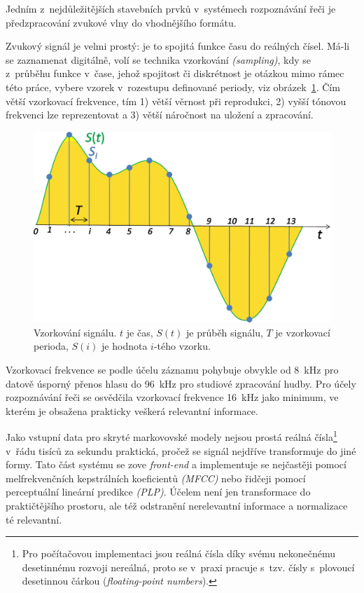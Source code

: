 Jedním z~nejdůležitějších stavebních prvků v~systémech rozpoznávání řeči je
předzpracování zvukové vlny do vhodnějšího formátu.

Zvukový signál je velmi prostý: je to spojitá funkce času do reálných čísel.
Má-li se zaznamenat digitálně, volí se technika vzorkování \textit{(sampling)},
kdy se z~průběhu funkce v~čase, jehož spojitost či diskrétnost je otázkou mimo
rámec této práce, vybere vzorek v~rozestupu definované periody, viz
obrázek~\ref{fig:sampling}. Čím větší
vzorkovací frekvence, tím 1) větší věrnost při reprodukci, 2) vyšší tónovou
frekvenci lze reprezentovat a 3) větší náročnost na uložení a zpracování.

\begin{figure}[htpb]
\includegraphics[scale=0.38]{rc/Signal_Sampling.png}
\caption{
    Vzorkování signálu. $t$ je čas, $S(t)$ je průběh signálu, $T$ je vzorkovací
    perioda, $S(i)$ je hodnota $i$-tého vzorku.
}
\label{fig:sampling}
\end{figure}

Vzorkovací frekvence se podle účelu záznamu pohybuje obvykle od 8~kHz pro
datově úsporný přenos hlasu do 96~kHz pro studiové zpracování hudby. Pro účely
rozpoznávání řeči se osvědčila vzorkovací frekvence 16~kHz jako minimum, ve
kterém je obsažena prakticky veškerá relevantní informace.

Jako vstupní data pro skryté markovovské modely nejsou prostá reálná
čísla\footnote{Pro počítačovou implementaci jsou reálná čísla díky svému
nekonečnému desetinnému rozvoji nereálná, proto se v~praxi pracuje s~tzv. čísly
s~plovoucí desetinnou čárkou (\textit{floating-point numbers}).} v~řádu tisíců
za sekundu praktická, pročež se signál nejdříve transformuje do jiné formy. Tato
část systému se zove \textit{front-end} a implementuje se nejčastěji pomocí
melfrekvenčních kepstrálních koeficientů \textit{(MFCC)} nebo řidčeji pomocí
perceptuální lineární predikce \textit{(PLP)}. Účelem není jen transformace do
praktičtějšího prostoru, ale též odstranění nerelevantní informace a normalizace
té relevantní.

